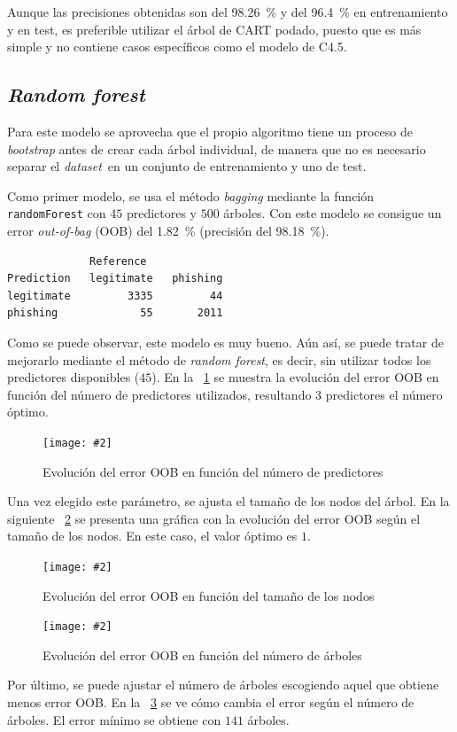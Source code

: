 \documentclass[12pt, a4paper]{article}
\renewcommand{\textit}{\textsl}
\newcommand*{\figref}[1]{\figurename~\ref{fig:#1}}
\newcommand{\figcaption}[4][H]{
  \begin{figure}[#1]
    \centering
    \texttt{[image: \#2]}
    \caption{#3}
    \label{fig:#2}
  \end{figure}
}
\newcommand*{\dataset}{\textit{dataset}}
\begin{document}
      Aunque las precisiones obtenidas son del \SI{98.26}{\percent} y del \SI{96.4}{\percent} en entrenamiento y en test, es preferible utilizar el árbol de CART podado, puesto que es más simple y no contiene casos específicos como el modelo de C4.5.

    \subsection{\textit{Random forest}}

      Para este modelo se aprovecha que el propio algoritmo tiene un proceso de \textit{bootstrap} antes de crear cada árbol individual, de manera que no es necesario separar el \dataset\ en un conjunto de entrenamiento y uno de test.

      Como primer modelo, se usa el método \textit{bagging} mediante la función \texttt{randomForest} con $45$ predictores y $500$ árboles. Con este modelo se consigue un error \textit{out-of-bag} (OOB) del \SI{1.82}{\percent} (precisión del \SI{98.18}{\percent}).

      \begin{verbatim}
             Reference
Prediction   legitimate   phishing
legitimate         3335         44
phishing             55       2011
      \end{verbatim}

      Como se puede observar, este modelo es muy bueno. Aún así, se puede tratar de mejorarlo mediante el método de \textit{random forest}, es decir, sin utilizar todos los predictores disponibles ($45$). En la \figref{mtry.png} se muestra la evolución del error OOB en función del número de predictores utilizados, resultando $3$ predictores el número óptimo.

      \figcaption{mtry.png}{Evolución del error OOB en función del número de predictores}{1}

      Una vez elegido este parámetro, se ajusta el tamaño de los nodos del árbol. En la siguiente \figref{nodesize.png} se presenta una gráfica con la evolución del error OOB según el tamaño de los nodos. En este caso, el valor óptimo es $1$.

      \figcaption{nodesize.png}{Evolución del error OOB en función del tamaño de los nodos}{1}

      \figcaption{trees.png}{Evolución del error OOB en función del número de árboles}{1}

      \newpage

      Por último, se puede ajustar el número de árboles escogiendo aquel que obtiene menos error OOB. En la \figref{trees.png} se ve cómo cambia el error según el número de árboles. El error mínimo se obtiene con $141$ árboles.
\end{document}
